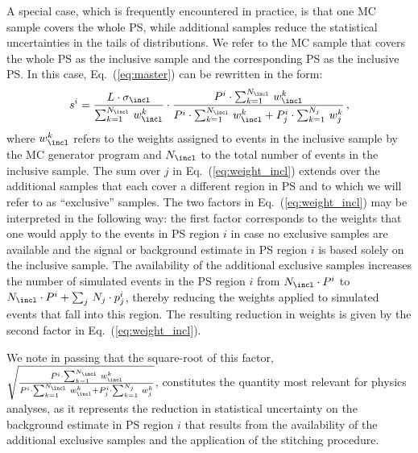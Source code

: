 A special case, which is frequently encountered in practice,
is that one MC sample covers the whole PS,
while additional samples reduce the statistical uncertainties in the tails of distributions.
We refer to the MC sample that covers the whole PS as the inclusive sample and the corresponding PS as the inclusive PS.
In this case, Eq.~(\ref{eq:master}) can be rewritten in the form:
\begin{equation}
s^{i} = \frac{L \cdot \sigma_{\incl}}{\sum_{k=1}^{N_{\incl}} \, w_{\incl}^{k}} \cdot \frac{P^{i} \cdot \sum_{k=1}^{N_{\incl}} \, w_{\incl}^{k}}{P^{i} \cdot \sum_{k=1}^{N_{\incl}} \, w_{\incl}^{k} + P_{j}^{i} \cdot \sum_{k=1}^{N_{j}} \, w_{j}^{k}} \, ,
\label{eq:weight_incl}
\end{equation}
where $w_{\incl}^{k}$ refers to the weights assigned to events in the inclusive sample by the MC generator program and $N_{\incl}$ to the total number of events in the inclusive sample.
The sum over $j$ in Eq.~(\ref{eq:weight_incl}) extends over the additional samples that each cover a different region in PS
and to which we will refer to as ``exclusive'' samples.
The two factors in Eq.~(\ref{eq:weight_incl}) may be interpreted in the following way:
the first factor corresponds to the weights that one would apply to the events in PS region $i$ 
in case no exclusive samples are available and the signal or background estimate in PS region $i$ is based solely on the inclusive sample.
The availability of the additional exclusive samples increases the number of simulated events in the PS region $i$ 
from $N_{\incl} \cdot P^{i}$ to $N_{\incl} \cdot P^{i} + \sum_{j} \, N_{j} \cdot p_{j}^{i}$,
thereby reducing the weights applied to simulated events that fall into this region.
The resulting reduction in weights is given by the second factor in Eq.~(\ref{eq:weight_incl}).

We note in passing that the square-root of this factor,
$\sqrt{\frac{P^{i} \cdot \sum_{k=1}^{N_{\incl}} \, w_{\incl}^{k}}{P^{i} \cdot \sum_{k=1}^{N_{\incl}} \, w_{\incl}^{k} + P_{j}^{i} \cdot \sum_{k=1}^{N_{j}} \, w_{j}^{k}}}$,
constitutes the quantity most relevant for physics analyses,
as it represents the reduction in statistical uncertainty on the background estimate in PS region $i$
that results from the availability of the additional exclusive samples and the application of the stitching procedure.
